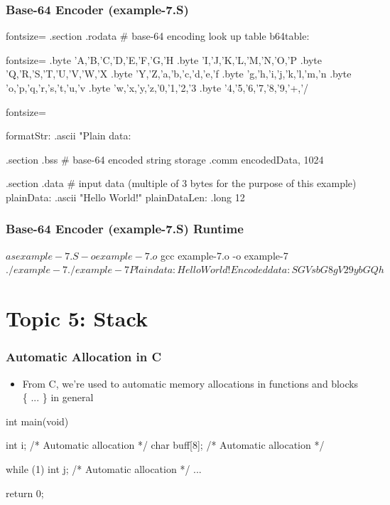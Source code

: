 \documentclass[11pt,xcolor=dvipsnames]{beamer}
\newcommand{\mvs}{\vspace{-0.95em}}
\begin{document}
\begin{frame}[fragile,t]
\frametitle{Base-64 Encoder (example-7.S)}
\mvs
\begin{gascode*}{fontsize=\fontsize{9}{8}}
.section .rodata
  # base-64 encoding look up table
  b64table:
\end{gascode*}
\begin{textcode*}{fontsize=\fontsize{9}{8}}
  .byte 'A,'B,'C,'D,'E,'F,'G,'H
  .byte 'I,'J,'K,'L,'M,'N,'O,'P
  .byte 'Q,'R,'S,'T,'U,'V,'W,'X
  .byte 'Y,'Z,'a,'b,'c,'d,'e,'f
  .byte 'g,'h,'i,'j,'k,'l,'m,'n
  .byte 'o,'p,'q,'r,'s,'t,'u,'v
  .byte 'w,'x,'y,'z,'0,'1,'2,'3
  .byte '4,'5,'6,'7,'8,'9,'+,'/
\end{textcode*}
\begin{gascode*}{fontsize=\fontsize{9}{8}}

formatStr:
  .ascii "Plain data: %

.section .bss
  # base-64 encoded string storage
  .comm encodedData, 1024

.section .data
  # input data (multiple of 3 bytes for the purpose of this example)
  plainData:      .ascii "Hello World!\0"
  plainDataLen:   .long 12
\end{gascode*}
\end{frame}

\begin{frame}[fragile,t]
\frametitle{Base-64 Encoder (example-7.S) Runtime}
\mvs
\begin{textcode}
$ as example-7.S -o example-7.o
$ gcc example-7.o -o example-7
$ ./example-7
./example-7
Plain data: Hello World!
Encoded data: SGVsbG8gV29ybGQh
$
\end{textcode}
\end{frame}

\section{Topic 5: Stack}

\begin{frame}[fragile,t]
\frametitle{Automatic Allocation in C}
\begin{itemize}
  \item From C, we're used to automatic memory allocations in functions and blocks \{ ... \} in general
\end{itemize}
\begin{ccode}
int main(void) {
  int i;            /* Automatic allocation */
  char buff[8];     /* Automatic allocation */

  while (1) {
    int j;          /* Automatic allocation */
    ...
  }

  return 0;
}
\end{ccode}
\end{frame}
\end{document}
